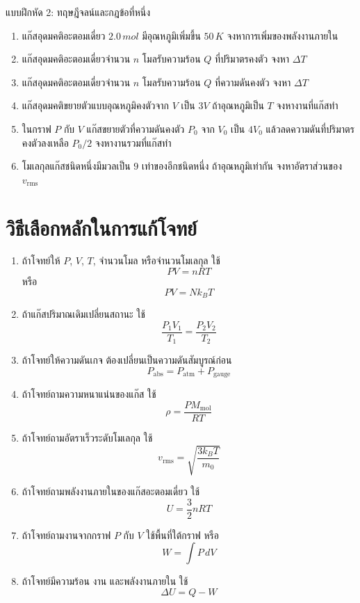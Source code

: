\begin{exercisebox}{แบบฝึกหัด 2: ทฤษฎีจลน์และกฎข้อที่หนึ่ง}
\begin{enumerate}
    \item แก๊สอุดมคติอะตอมเดี่ยว $2.0\,\si{mol}$ มีอุณหภูมิเพิ่มขึ้น $50\,\si{K}$ จงหาการเพิ่มของพลังงานภายใน
    \item แก๊สอุดมคติอะตอมเดี่ยวจำนวน $n$ โมลรับความร้อน $Q$ ที่ปริมาตรคงตัว จงหา $\Delta T$
    \item แก๊สอุดมคติอะตอมเดี่ยวจำนวน $n$ โมลรับความร้อน $Q$ ที่ความดันคงตัว จงหา $\Delta T$
    \item แก๊สอุดมคติขยายตัวแบบอุณหภูมิคงตัวจาก $V$ เป็น $3V$ ถ้าอุณหภูมิเป็น $T$ จงหางานที่แก๊สทำ
    \item ในกราฟ $P$ กับ $V$ แก๊สขยายตัวที่ความดันคงตัว $P_0$ จาก $V_0$ เป็น $4V_0$ แล้วลดความดันที่ปริมาตรคงตัวลงเหลือ $P_0/2$ จงหางานรวมที่แก๊สทำ
    \item โมเลกุลแก๊สชนิดหนึ่งมีมวลเป็น $9$ เท่าของอีกชนิดหนึ่ง ถ้าอุณหภูมิเท่ากัน จงหาอัตราส่วนของ $v_{\text{rms}}$
\end{enumerate}
\end{exercisebox}

\section{วิธีเลือกหลักในการแก้โจทย์}

\begin{tcolorbox}[title=แผนการเลือกสมการ]
\begin{enumerate}
    \item ถ้าโจทย์ให้ $P$, $V$, $T$, จำนวนโมล หรือจำนวนโมเลกุล ใช้
    \[
    PV=nRT
    \]
    หรือ
    \[
    PV=Nk_BT
    \]

    \item ถ้าแก๊สปริมาณเดิมเปลี่ยนสถานะ ใช้
    \[
    \frac{P_1V_1}{T_1}
    =
    \frac{P_2V_2}{T_2}
    \]

    \item ถ้าโจทย์ให้ความดันเกจ ต้องเปลี่ยนเป็นความดันสัมบูรณ์ก่อน
    \[
    P_{\text{abs}}
    =
    P_{\text{atm}}+P_{\text{gauge}}
    \]

    \item ถ้าโจทย์ถามความหนาแน่นของแก๊ส ใช้
    \[
    \rho
    =
    \frac{PM_{\text{mol}}}{RT}
    \]

    \item ถ้าโจทย์ถามอัตราเร็วระดับโมเลกุล ใช้
    \[
    v_{\text{rms}}
    =
    \sqrt{\frac{3k_BT}{m_0}}
    \]

    \item ถ้าโจทย์ถามพลังงานภายในของแก๊สอะตอมเดี่ยว ใช้
    \[
    U
    =
    \frac{3}{2}nRT
    \]

    \item ถ้าโจทย์ถามงานจากกราฟ $P$ กับ $V$ ใช้พื้นที่ใต้กราฟ หรือ
    \[
    W=\int P\,dV
    \]

    \item ถ้าโจทย์มีความร้อน งาน และพลังงานภายใน ใช้
    \[
    \Delta U=Q-W
    \]
\end{enumerate}
\end{tcolorbox}

